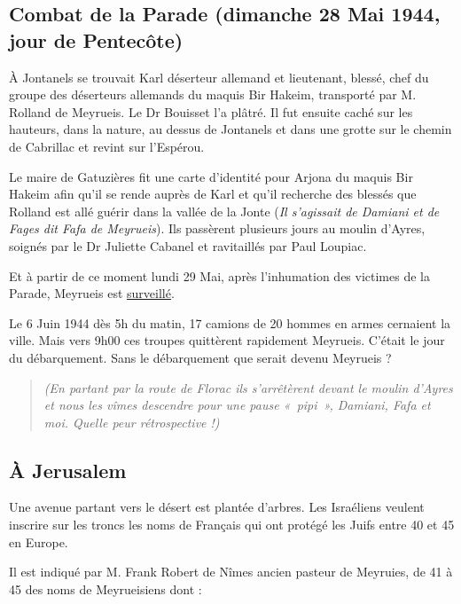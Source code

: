 \subsection{Combat de la Parade (dimanche 28 Mai 1944, jour de Pentecôte)}

À Jontanels se trouvait Karl déserteur allemand et lieutenant, blessé, chef du groupe des
déserteurs allemands du maquis Bir Hakeim, transporté par M. Rolland de Meyrueis. Le Dr
Bouisset l’a plâtré. Il fut ensuite caché sur les hauteurs, dans la nature, au dessus de Jontanels
et dans une grotte sur le chemin de Cabrillac et revint sur l’Espérou.

Le maire de Gatuzières fit une carte d’identité pour Arjona du maquis Bir Hakeim afin qu’il
se rende auprès de Karl et qu’il recherche des blessés que Rolland est allé guérir dans la vallée
de la Jonte (\textit{Il s’agissait de Damiani et de Fages dit Fafa de Meyrueis}). Ils passèrent
plusieurs jours au moulin d’Ayres, soignés par le Dr Juliette Cabanel et ravitaillés par Paul
Loupiac.

Et à partir de ce moment lundi 29 Mai, après l’inhumation des victimes de la Parade,
Meyrueis est \underline{surveillé}.

Le 6 Juin 1944 dès 5h du matin, 17 camions de 20 hommes en armes cernaient la ville. Mais
vers 9h00 ces troupes quittèrent rapidement Meyrueis. C’était le jour du débarquement. Sans
le débarquement que serait devenu Meyrueis ?

\begin{quote}
\textit{(En partant par la route de Florac ils s’arrêtèrent devant le moulin d’Ayres et nous les vîmes
descendre pour une pause «~pipi~», Damiani, Fafa et moi. Quelle peur rétrospective !)}
\end{quote}

\subsection{À Jerusalem}

Une avenue partant vers le désert est plantée d’arbres. Les Israéliens veulent inscrire sur les
troncs les noms de Français qui ont protégé les Juifs entre 40 et 45 en Europe.

Il est indiqué par M. Frank Robert de Nîmes ancien pasteur de Meyruies, de 41 à 45 des
noms de Meyrueisiens dont :

